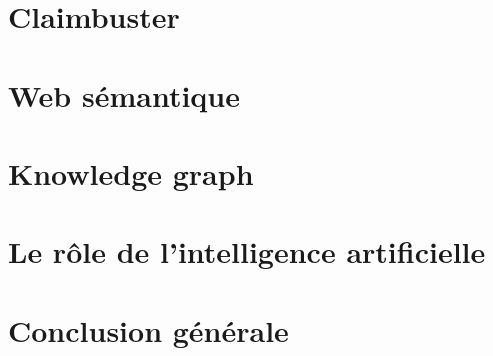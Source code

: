 \documentclass[12pt]{article}
\begin{document}

\clearpage

\section{Claimbuster}


\clearpage

\section{Web sémantique}


\clearpage

\section{Knowledge graph}
\label{section_knowledge_graph}


\clearpage

\section{Le rôle de l'intelligence artificielle}


\clearpage

\section{Conclusion générale}


\clearpage

\printbibliography[
heading=bibintoc,
title={Bibliographie}
]

\clearpage


\end{document}
